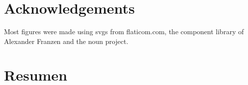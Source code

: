 \documentclass[12pt]{book}
\newcommand\blankpage{
    \null
    \thispagestyle{empty}
    \addtocounter{page}{0}
    \newpage
    }
\begin{document}

\chapter*{Acknowledgements}
\thispagestyle{plain}
Most figures were made using svgs from flaticom.com, the component library of Alexander Franzen and the noun project.

\pagebreak



\blankpage{}
\chapter*{Resumen}
\end{document}
